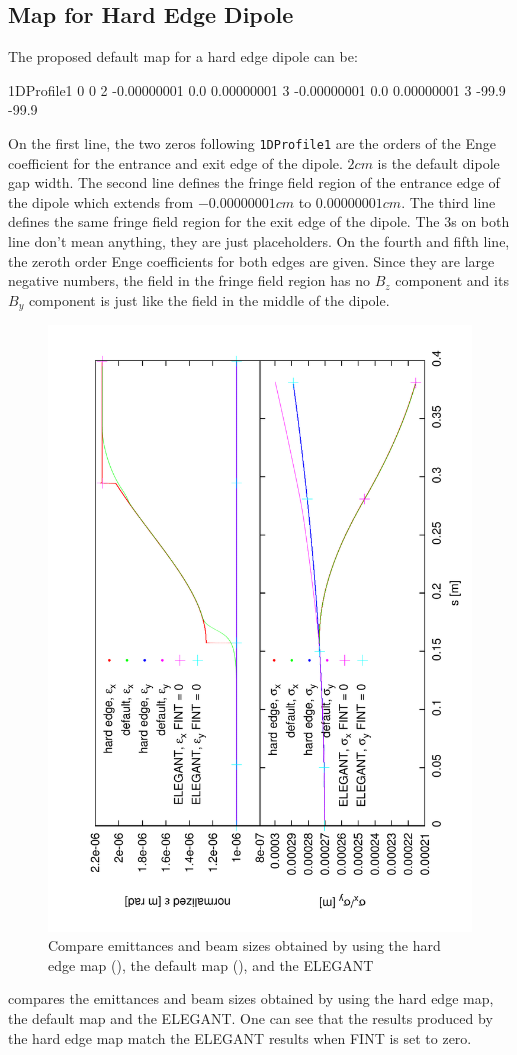 \subsection{Map for Hard Edge Dipole}
The proposed default map for a hard edge dipole can be:
\begin{description}
\item
\begin{example}
1DProfile1  0  0  2
-0.00000001 0.0 0.00000001 3
-0.00000001 0.0 0.00000001 3
-99.9
-99.9
\end{example}
\end{description}
On the first line, the two zeros following  \texttt{1DProfile1} are the orders of the Enge coefficient for the entrance and exit edge of the dipole. $2 cm$ is the default dipole gap width. The second line defines the fringe field region of the entrance edge of the dipole which extends from $-0.00000001 cm$ to $0.00000001 cm$.  The third line defines the same fringe field region for the exit edge of the dipole. The $3$s on both line don't mean anything, they are just placeholders. On the fourth and fifth line, the zeroth order Enge coefficients for both edges are given. Since they are large negative numbers, the field in the fringe field region has no $B_z$ component and its $B_y$ component is just like the field in the middle of the dipole.
\begin{figure}[!htbp]
\centering
\includegraphics[height=0.5\textwidth-0.6cm, angle = -90, trim = 8mm 10mm 2mm 10mm, clip]{figures/Benchmarks/report-compare-default}
\caption{Compare emittances and beam sizes obtained by using the hard edge map (\opal), the default map (\opal), and the ELEGANT}
\label{fig:plot-compare-default}
\end{figure}
 compares the emittances and beam sizes obtained by using the hard edge map, the default map and the ELEGANT. One can see that the results produced by the hard edge map match the ELEGANT results when FINT is set to zero.

